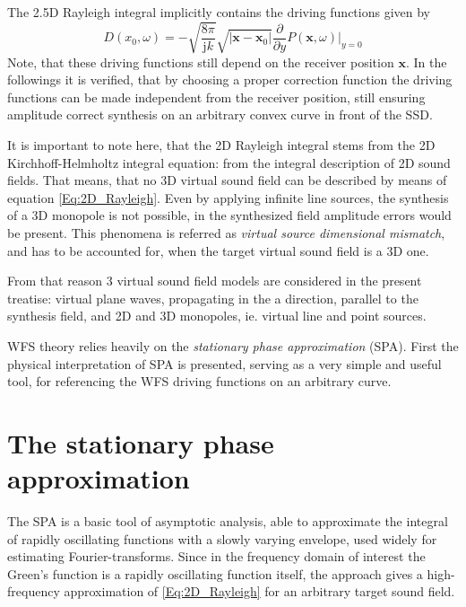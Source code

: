 \documentclass[12pt,a4paper]{article}
\newcommand{\ti}{\mathrm{j}}
\newcommand{\vx}{\mathbf{x}}
\newcommand{\vxo}{\mathbf{x}_0}
\begin{document}
The 2.5D Rayleigh integral implicitly contains the driving functions given by 
\begin{equation}
D(x_0,\omega) = 
- \sqrt{\frac{8\pi}{\ti k}} \sqrt{|\vx-\vxo|} \frac{\partial}{\partial y} \left. P(\vx,\omega) \right|_{y = 0}
\label{Eq:2_5D_driv_fun_implicit}
\end{equation}
Note, that these driving functions still depend on the receiver position $\vx$. In the followings it is verified, that by choosing a proper correction function the driving functions can be made independent from the receiver position, still ensuring amplitude correct synthesis on an arbitrary convex curve in front of the SSD.

\vspace{3mm}
It is important to note here, that the 2D Rayleigh integral stems from the 2D Kirchhoff-Helmholtz integral equation: from the integral description of 2D sound fields. That means, that no 3D virtual sound field can be described by means of equation \eqref{Eq:2D_Rayleigh}. Even by applying infinite line sources, the synthesis of a 3D monopole is not possible, in the synthesized field amplitude errors would be present. This phenomena is referred as \emph{virtual source dimensional mismatch}, and has to be accounted for, when the target virtual sound field is a 3D one.

From that reason 3 virtual sound field models are considered in the present treatise: virtual plane waves, propagating in the a direction, parallel to the synthesis field, and 2D and 3D monopoles, ie. virtual line and point sources.

\vspace{3mm}
WFS theory relies heavily on the \emph{stationary phase approximation} (SPA). First the physical interpretation of SPA is presented, serving as a very simple and useful tool, for referencing the WFS driving functions on an arbitrary curve.

\section{The stationary phase approximation}

The SPA is a basic tool of asymptotic analysis, able to approximate the integral of rapidly oscillating functions with a slowly varying envelope, used widely for estimating Fourier-transforms.
Since in the frequency domain of interest the Green's function is a rapidly oscillating function itself, the approach gives a high-frequency approximation of \eqref{Eq:2D_Rayleigh} for an arbitrary target sound field.
\end{document}
